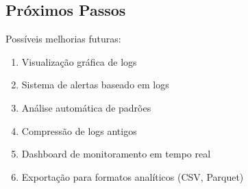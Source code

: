 \documentclass[11pt,a4paper]{article}
\begin{document}
\subsection{Próximos Passos}

Possíveis melhorias futuras:

\begin{enumerate}
    \item Visualização gráfica de logs
    \item Sistema de alertas baseado em logs
    \item Análise automática de padrões
    \item Compressão de logs antigos
    \item Dashboard de monitoramento em tempo real
    \item Exportação para formatos analíticos (CSV, Parquet)
\end{enumerate}
\end{document}
